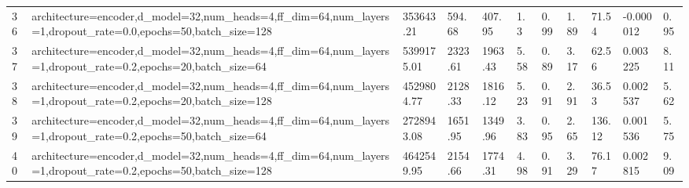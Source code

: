 \begin{longtable}{C{0.8cm} L{2cm} C{1.15cm} C{1.15cm} C{1.15cm} C{1.15cm} C{0.85cm} C{1.25cm} C{1.2cm} C{1.5cm} C{1.0cm}}
36 & architecture=encoder,\newline d\_model=32,\newline num\_heads=4,\newline ff\_dim=64,\newline num\_layers=1,\newline dropout\_rate=0.0,\newline epochs=50,\newline batch\_size=128 & 353643.21 & 594.68 & 407.95 & 1.3 & 0.99 & 1.89 & 71.54 & -0.000012 & 0.95 \\
37 & architecture=encoder,\newline d\_model=32,\newline num\_heads=4,\newline ff\_dim=64,\newline num\_layers=1,\newline dropout\_rate=0.2,\newline epochs=20,\newline batch\_size=64 & 5399175.01 & 2323.61 & 1963.43 & 5.58 & 0.89 & 3.17 & 62.56 & 0.003225 & 8.11 \\
38 & architecture=encoder,\newline d\_model=32,\newline num\_heads=4,\newline ff\_dim=64,\newline num\_layers=1,\newline dropout\_rate=0.2,\newline epochs=20,\newline batch\_size=128 & 4529804.77 & 2128.33 & 1816.12 & 5.23 & 0.91 & 2.91 & 36.53 & 0.002537 & 5.62 \\
39 & architecture=encoder,\newline d\_model=32,\newline num\_heads=4,\newline ff\_dim=64,\newline num\_layers=1,\newline dropout\_rate=0.2,\newline epochs=50,\newline batch\_size=64 & 2728943.08 & 1651.95 & 1349.96 & 3.83 & 0.95 & 2.65 & 136.12 & 0.001536 & 5.75 \\
40 & architecture=encoder,\newline d\_model=32,\newline num\_heads=4,\newline ff\_dim=64,\newline num\_layers=1,\newline dropout\_rate=0.2,\newline epochs=50,\newline batch\_size=128 & 4642549.95 & 2154.66 & 1774.31 & 4.98 & 0.91 & 3.29 & 76.17 & 0.002815 & 9.09 \\

\end{longtable}
